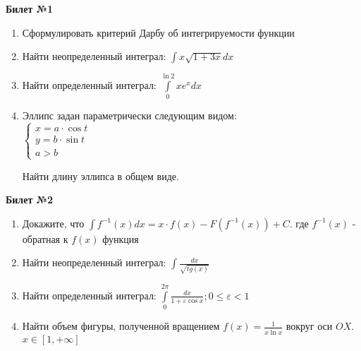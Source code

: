 \documentclass[a4paper, 12pt]{article}
\begin{document}
\begin{center}
    \textbf{Билет №1}
\end{center}
\begin{enumerate}
\item Сформулировать критерий Дарбу об интегрируемости функции
\item Найти неопределенный интеграл: $ \displaystyle \int{x\sqrt{1+3x}}dx$
\item Найти определенный интеграл: $\displaystyle \int\limits_{0}^{\ln{2}}{xe^xdx}$
\item Эллипс задан параметрически следующим видом: \\ 

$
	\begin{cases}
		x = a\cdot\cos{t} \\
		y=b\cdot\sin{t} \\
		a > b
		
	\end{cases}
$

Найти длину эллипса в общем виде.

\end{enumerate}

\begin{center}
	\textbf{Билет №2}
\end{center}
\begin{enumerate}
	\item Докажите, что $\displaystyle \int{f^{-1}(x)}dx = x\cdot f(x) - F(f^{-1}(x)) + C$. где $f^{-1}(x)$ - обратная к $f(x)$ функция
	\item Найти неопределенный интеграл: $\displaystyle \int{\frac{dx}{\sqrt{tg(x)}}}$
	\item Найти определенный интеграл: $\displaystyle \int\limits_{0}^{2\pi}{\frac{dx}{1+\varepsilon \cos{x}}; 0 \le \varepsilon < 1}$
	\item Найти объем фигуры, полученной вращением $\displaystyle f(x) = \frac{1}{x \ddot \ln{x}}$ вокруг оси $OX$. $\displaystyle x \in \left[1,+\infty\right]$
	
\end{enumerate}
\end{document}
